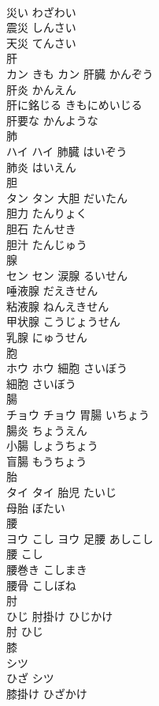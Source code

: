 \documentclass[8pt]{extreport}
\begin{document}
\begin{CJK}{UTF8}{min}
\\	災い	わざわい	
\\	震災	しんさい	
\\	天災	てんさい	
\\	肝	
\\	カン	きも	カン	肝臓	かんぞう	
\\	肝炎	かんえん	
\\	肝に銘じる	きもにめいじる	
\\	肝要な	かんような	
\\	肺	
\\	ハイ		ハイ	肺臓	はいぞう	
\\	肺炎	はいえん	
\\	胆	
\\	タン		タン	大胆	だいたん	
\\	胆力	たんりょく	
\\	胆石	たんせき	
\\	胆汁	たんじゅう	
\\	腺	
\\	セン		セン	涙腺	るいせん	
\\	唾液腺	だえきせん	
\\	粘液腺	ねんえきせん	
\\	甲状腺	こうじょうせん	
\\	乳腺	にゅうせん	
\\	胞	
\\	ホウ		ホウ	細胞	さいぼう	
\\	細胞	さいぼう	
\\	腸	
\\	チョウ		チョウ	胃腸	いちょう	
\\	腸炎	ちょうえん	
\\	小腸	しょうちょう	
\\	盲腸	もうちょう	
\\	胎	
\\	タイ		タイ	胎児	たいじ	
\\	母胎	ぼたい	
\\	腰	
\\	ヨウ	こし	ヨウ													足腰	あしこし	
\\	腰	こし	
\\	腰巻き	こしまき	
\\	腰骨	こしぼね	
\\	肘	
\\	ひじ		肘掛け	ひじかけ	
\\	肘	ひじ	
\\	膝	
\\	シツ
\\	ひざ	シツ
\\	膝掛け	ひざかけ	

\end{CJK}
\end{document}

